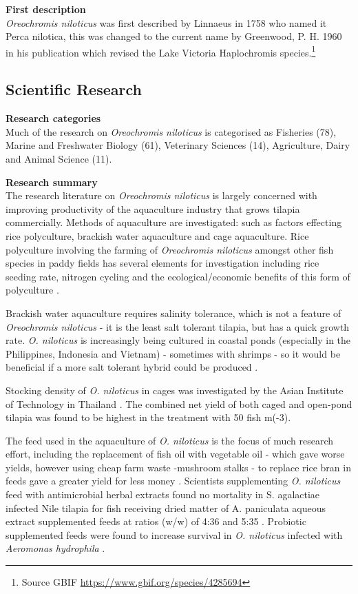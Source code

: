 \documentclass[]{book}
\let\rmarkdownfootnote\footnote%
\def\footnote{\protect\rmarkdownfootnote}
\theoremstyle{definition}
\theoremstyle{definition}
\theoremstyle{definition}
\theoremstyle{remark}
\begin{document}
\textbf{First description}\\
\emph{Oreochromis niloticus} was first described by Linnaeus in 1758 who
named it Perca nilotica, this was changed to the current name by
Greenwood, P. H. 1960 in his publication which revised the Lake Victoria
Haplochromis species.\footnote{Source GBIF
  \url{https://www.gbif.org/species/4285694}}

\hypertarget{scientific-research-5}{%
\subsection{Scientific Research}\label{scientific-research-5}}

\textbf{Research categories}\\
Much of the research on \emph{Oreochromis niloticus} is categorised as
Fisheries (78), Marine and Freshwater Biology (61), Veterinary Sciences
(14), Agriculture, Dairy and Animal Science (11).

\textbf{Research summary}\\
The research literature on \emph{Oreochromis niloticus} is largely
concerned with improving productivity of the aquaculture industry that
grows tilapia commercially. Methods of aquaculture are investigated:
such as factors effecting rice polyculture, brackish water aquaculture
and cage aquaculture. Rice polyculture involving the farming of
\emph{Oreochromis niloticus} amongst other fish species in paddy fields
has several elements for investigation including rice seeding rate,
nitrogen cycling and the ecological/economic benefits of this form of
polyculture \citep{Vromant_2002, Rothuis_1999, Oehme_2007}.

Brackish water aquaculture requires salinity tolerance, which is not a
feature of \emph{Oreochromis niloticus} - it is the least salt tolerant
tilapia, but has a quick growth rate. \emph{O. niloticus} is
increasingly being cultured in coastal ponds (especially in the
Philippines, Indonesia and Vietnam) - sometimes with shrimps - so it
would be beneficial if a more salt tolerant hybrid could be produced
\citep{Kamal_2005}.

Stocking density of \emph{O. niloticus} in cages was investigated by the
Asian Institute of Technology in Thailand \citep{Yi_1996}. The combined
net yield of both caged and open-pond tilapia was found to be highest in
the treatment with 50 fish m(-3).

The feed used in the aquaculture of \emph{O. niloticus} is the focus of
much research effort, including the replacement of fish oil with
vegetable oil - which gave worse yields, however using cheap farm waste
-mushroom stalks - to replace rice bran in feeds gave a greater yield
for less money \citep{Karapanagiotidis_2007, Afsharnasab_2015}.
Scientists supplementing \emph{O. niloticus} feed with antimicrobial
herbal extracts found no mortality in S. agalactiae infected Nile
tilapia for fish receiving dried matter of A. paniculata aqueous extract
supplemented feeds at ratios (w/w) of 4:36 and 5:35
\citep{Rattanachaikunsopon_2009}. Probiotic supplemented feeds were
found to increase survival in \emph{O. niloticus} infected with
\emph{Aeromonas hydrophila} \citep{Kaew-on_2016}.
\end{document}
